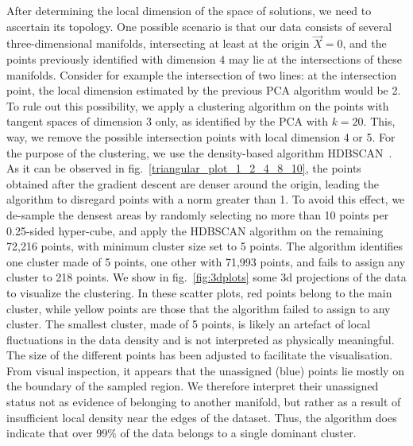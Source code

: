\documentclass[11pt,a4paper]{article}
\begin{document}
	After determining the local dimension of the space of solutions, we need to ascertain its topology. 
One possible scenario is that our data consists of several three-dimensional manifolds, intersecting at least at the origin $\vec{X}=0$, and the points previously identified with dimension $4$ may lie at the intersections of these manifolds. 
Consider for example the intersection of two lines: at the intersection point, the local dimension estimated by the previous PCA algorithm would be 2. 
To rule out this possibility, we apply a clustering algorithm on the points with tangent spaces of dimension 3 only, as identified by the PCA with $k=20$. 
This, way, we remove the possible intersection points with local dimension 4 or 5. 
For the purpose of the clustering, we use the density-based algorithm HDBSCAN~\cite{10.1007/978-3-642-37456-2_14}. 
As it can be observed in fig.~\ref{triangular_plot_1_2_4_8_10}, the points obtained after the gradient descent are denser around the origin, leading the algorithm to disregard points with a norm greater than 1. 
To avoid this effect, we de-sample the densest areas by randomly selecting no more than 10 points per 0.25-sided hyper-cube, and apply the HDBSCAN algorithm on the remaining 72,216 points, with minimum cluster size set to 5 points. 
The algorithm identifies one cluster made of 5 points, one other with 71,993 points, and fails to assign any cluster to 218 points. We show in fig.~\ref{fig:3dplots} some 3d projections of the data to visualize the clustering. In these scatter plots, red points belong to the main cluster, while yellow points are those that the algorithm failed to assign to any cluster. The smallest cluster, made of 5 points, is likely an artefact of local fluctuations in the data density and is not interpreted as physically meaningful. The size of the different points has been adjusted to facilitate the visualisation. From visual inspection, it appears that the unassigned (blue) points lie mostly on the boundary of the sampled region. We therefore interpret their unassigned status not as evidence of belonging to another manifold, but rather as a result of insufficient local density near the edges of the dataset. Thus, the algorithm does indicate that over 99\% of the data belongs to a single dominant cluster.
\end{document}
